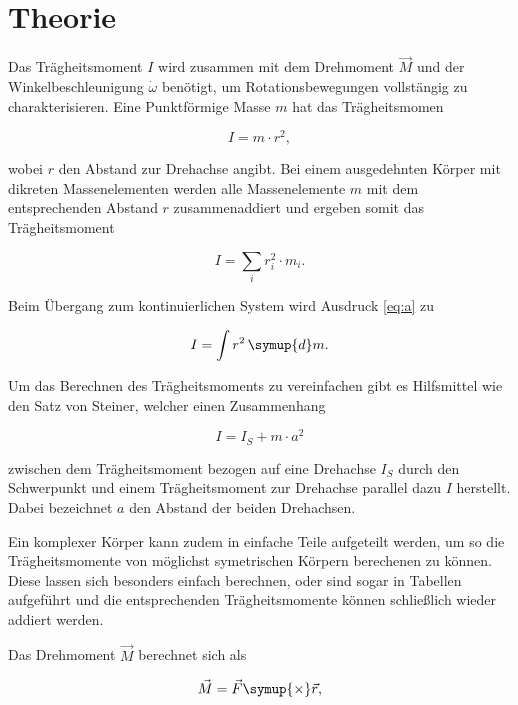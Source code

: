 \section{Theorie}
\label{sec:Theorie}

Das Trägheitsmoment $I$ wird zusammen mit dem
Drehmoment $\vec{M}$ und der Winkelbeschleunigung $\dot{\omega}$
benötigt, um Rotationsbewegungen vollstängig zu charakterisieren.
Eine Punktförmige Masse $m$ hat das Trägheitsmomen

\begin{equation}
    I=m \cdot r^2,
\end{equation}

\noindent wobei $r$ den Abstand zur Drehachse angibt.
Bei einem ausgedehnten Körper mit dikreten Massenelementen 
werden alle Massenelemente $m$ 
mit dem entsprechenden Abstand $r$ zusammenaddiert und 
ergeben somit das Trägheitsmoment

\begin{equation}
    I=\sum_i r_i^2 \cdot m_i.
    \label{eq:a}
\end{equation}

\noindent Beim Übergang zum kontinuierlichen System wird 
Ausdruck \ref{eq:a} zu

\begin{equation}
    I=\int r^2 \, \symup{d}m.
\end{equation}

\noindent Um das Berechnen des Trägheitsmoments zu vereinfachen
gibt es Hilfsmittel wie den Satz von Steiner, welcher
einen Zusammenhang 

\begin{equation}
    I=I_S+m \cdot a^2
    \label{eq:steiner}
\end{equation}

\noindent zwischen dem Trägheitsmoment bezogen auf eine
Drehachse $I_S$ durch den Schwerpunkt und einem Trägheitsmoment
zur Drehachse parallel dazu $I$ herstellt. Dabei bezeichnet $a$
den Abstand der beiden Drehachsen.

Ein komplexer Körper kann zudem in einfache Teile aufgeteilt werden, um
so die Trägheitsmomente von möglichst symetrischen Körpern berechenen
zu können. Diese lassen sich besonders einfach berechnen, oder
sind sogar in Tabellen aufgeführt und die 
entsprechenden Trägheitsmomente können schließlich wieder addiert werden.

Das Drehmoment $\vec{M}$ berechnet sich als

\begin{equation}
    \vec{M}=\vec{F} \symup{\times} \vec{r},
    \label{eq:fa1}
\end{equation}

